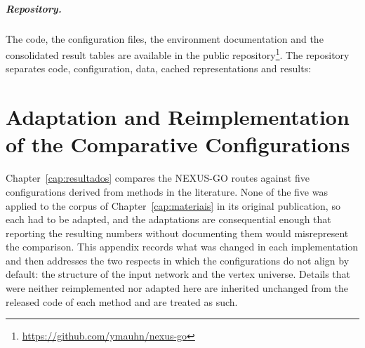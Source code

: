 \documentclass[Ingles]{ic-tese-v3}
\begin{document}
\begin{appendices}{}
\paragraph{Repository.} The code, the configuration files, the environment documentation and the
consolidated result tables are available in the public
repository\footnote{\url{https://github.com/ymauhn/nexus-go}}. The repository separates code,
configuration, data, cached representations and results:

\begin{center}
\end{center}


\chapter{Adaptation and Reimplementation of the Comparative Configurations}
\label{ape:comparativos}

Chapter~\ref{cap:resultados} compares the NEXUS-GO routes against five configurations derived from
methods in the literature. None of the five was applied to the corpus of Chapter~\ref{cap:materiais}
in its original publication, so each had to be adapted, and the adaptations are consequential enough
that reporting the resulting numbers without documenting them would misrepresent the comparison.
This appendix records what was changed in each implementation and then addresses the two respects in
which the configurations do not align by default: the structure of the input network and the vertex
universe. Details that were neither reimplemented nor adapted here are inherited unchanged from the
released code of each method and are treated as such.


\end{appendices}
\end{document}
